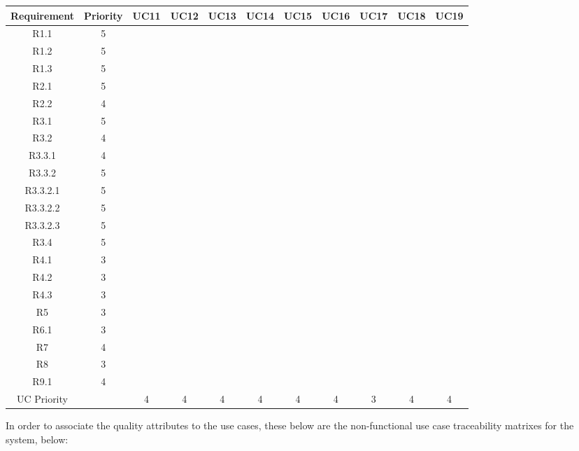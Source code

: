 \documentclass[11pt]{article}
\begin{document}
\begin{center}
	\hspace*{-1.1cm}\begin{tabular}{|c|c|c|c|c|c|c|c|c|c|c|}
	\hline
	Requirement & Priority & UC11 & UC12 & UC13 & UC14 & UC15 & UC16 & UC17 & UC18 & UC19 \\
	\hline
	R1.1 & 5 & & & & & & & & & \\
	\hline
	R1.2 & 5 & & & & & & & & & \\
	\hline
	R1.3 & 5 & & & & & & & & & \\
	\hline
	R2.1 & 5 & & & & & & & & & \\
	\hline
	R2.2 & 4 & & & & & & & & & \\
	\hline 
	R3.1 & 5 & & & & & & & & & \\
	\hline
	R3.2 & 4 & & & & & & & & & \\
	\hline
	R3.3.1 & 4 & & & & & & & & & \\
	\hline
	R3.3.2 & 5 & & & & & & & & & \\
	\hline
	R3.3.2.1 & 5 & & & & & & & & & \\
	\hline
	R3.3.2.2 & 5 & & & & & & & & & \\
	\hline
	R3.3.2.3 & 5 & & & & & & & & & \\
	\hline
	R3.4 & 5 & & & & & & & & & \\
	\hline
	R4.1 & 3 & & & & & & & & & \\
	\hline 
	R4.2 & 3 & & & & & & & & & \\
	\hline
	R4.3 & 3 & & & & & & & & & \\
	\hline
	R5 & 3 & & & & & & & & & \\
	\hline
	R6.1 & 3 & & & & & & & & & \\
	\hline
	R7 & 4 & & & & & & & & & \\
	\hline
	R8 & 3 & & & & & & & & & \\
	\hline
	R9.1 & 4 & & & & & & & & & \\
	\hline
	UC Priority & & 4 & 4 & 4 & 4 & 4 & 4 & 3 & 4 & 4\\
	\hline
	\end{tabular}
\end{center}

In order to associate the quality attributes to the use cases, these below are the non-functional use case traceability matrixes for the system, below: 
\end{document}
